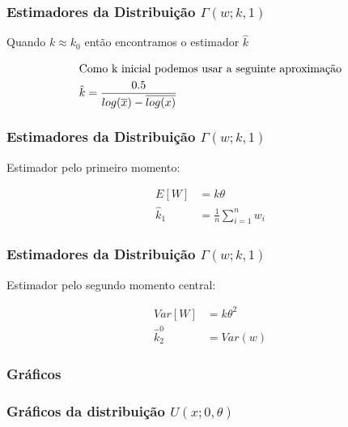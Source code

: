 \begin{frame}
  \frametitle{Estimadores da Distribuição $\Gamma(w;k,1)$}
  Quando $k \approx k_0$ então encontramos o estimador $\hat{k}$  

  \small \begin{align*}
    \intertext{Como k inicial podemos usar a seguinte aproximação}
    \hat{k} &= \frac{0.5}{log(\overline{x}) - \overline{log(x)}}
  \end{align*}
\end{frame}

\begin{frame}
  \frametitle{Estimadores da Distribuição $\Gamma(w;k,1)$}
  
  Estimador pelo primeiro momento:
  
    \begin{align*}
      E[W] &= k\theta \\
      \hat{k}_1 &= \frac{1}{n} \sum_{i=1}^nw_i 
    \end{align*}
\end{frame}

\begin{frame}
  \frametitle{Estimadores da Distribuição $\Gamma(w;k,1)$}
  
  Estimador pelo segundo momento central:
  
    \begin{align*}
      Var[W] &= k\theta^2 \\
      \hat{k}_2^0 &= Var(w)  
    \end{align*}
\end{frame}


\subsubsection{Gráficos}
\begin{frame}
\frametitle{Gráficos da distribuição $U(x; 0,\theta)$}

\end{frame}



